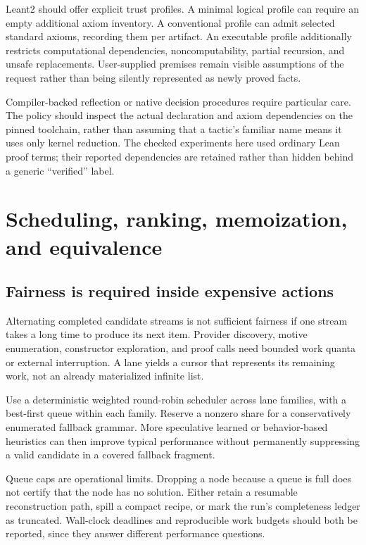 \documentclass[11pt,letterpaper]{article}
\newcommand{\id}[1]{\texttt{\detokenize{#1}}}
\theoremstyle{definition}
\theoremstyle{remark}
\begin{document}
Leant2 should offer explicit trust profiles. A minimal logical profile can require an empty additional axiom inventory. A conventional profile can admit selected standard axioms, recording them per artifact. An executable profile additionally restricts computational dependencies, noncomputability, partial recursion, and unsafe replacements. User-supplied premises remain visible assumptions of the request rather than being silently represented as newly proved facts.

Compiler-backed reflection or native decision procedures require particular care. The policy should inspect the actual declaration and axiom dependencies on the pinned toolchain, rather than assuming that a tactic's familiar name means it uses only kernel reduction. The checked experiments here used ordinary Lean proof terms; their reported \id{propext} dependencies are retained rather than hidden behind a generic ``verified'' label.

\section{Scheduling, ranking, memoization, and equivalence}
\label{sec:performance}

\subsection{Fairness is required inside expensive actions}

Alternating completed candidate streams is not sufficient fairness if one stream takes a long time to produce its next item. Provider discovery, motive enumeration, constructor exploration, and proof calls need bounded work quanta or external interruption. A lane yields a cursor that represents its remaining work, not an already materialized infinite list.

Use a deterministic weighted round-robin scheduler across lane families, with a best-first queue within each family. Reserve a nonzero share for a conservatively enumerated fallback grammar. More speculative learned or behavior-based heuristics can then improve typical performance without permanently suppressing a valid candidate in a covered fallback fragment.

Queue caps are operational limits. Dropping a node because a queue is full does not certify that the node has no solution. Either retain a resumable reconstruction path, spill a compact recipe, or mark the run's completeness ledger as truncated. Wall-clock deadlines and reproducible work budgets should both be reported, since they answer different performance questions.
\end{document}
